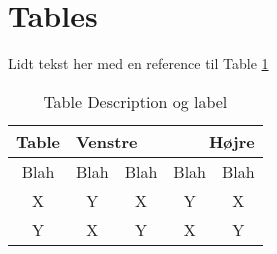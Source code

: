 \section{Tables}

Lidt tekst her med en reference til Table \ref{table:table:table}
\begin{table}[h]
    \begin{center}
        \begin{tabular}{|c|c|c|c|c|}
    
            \hline
            Table & \multicolumn{2}{l|}{Venstre} & \multicolumn{2}{r|}{Højre} \\
            \hline
            Blah & Blah & Blah & Blah & Blah \\
            \hline
            X & Y & X & Y & X \\
            \hline
            Y & X & Y & X & Y \\
            \hline
        \end{tabular}
    \end{center}
\caption{\label{table:table:table}Table Description og label}
\end{table}